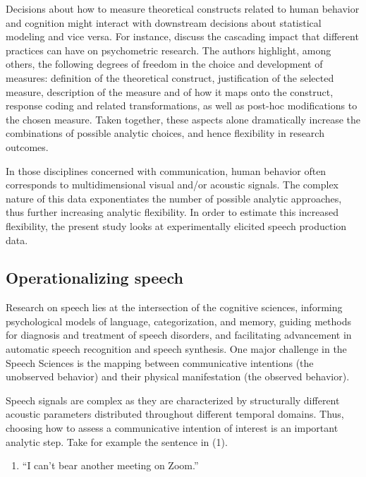 \documentclass[Review,times,sageh]{sagej}
\providecommand{\tightlist}{\setlength{\itemsep}{0pt}\setlength{\parskip}{0pt}}
\begin{document}
Decisions about how to measure theoretical constructs related to human behavior and cognition might interact with downstream decisions about statistical modeling and vice versa.
For instance, \citet{flake2020} discuss the cascading impact that different practices can have on psychometric research.
The authors highlight, among others, the following degrees of freedom in the choice and development of measures: definition of the theoretical construct, justification of the selected measure, description of the measure and of how it maps onto the construct, response coding and related transformations, as well as post-hoc modifications to the chosen measure.
Taken together, these aspects alone dramatically increase the combinations of possible analytic choices, and hence flexibility in research outcomes.

In those disciplines concerned with communication, human behavior often corresponds to multidimensional visual and/or acoustic signals.
The complex nature of this data exponentiates the number of possible analytic approaches, thus further increasing analytic flexibility.
In order to estimate this increased flexibility, the present study looks at experimentally elicited speech production data.\\

\hypertarget{s:operspeech}{%
\subsection{Operationalizing speech}\label{s:operspeech}}

Research on speech lies at the intersection of the cognitive sciences, informing psychological models of language, categorization, and memory, guiding methods for diagnosis and treatment of speech disorders, and facilitating advancement in automatic speech recognition and speech synthesis.
One major challenge in the Speech Sciences is the mapping between communicative intentions (the unobserved behavior) and their physical manifestation (the observed behavior).

Speech signals are complex as they are characterized by structurally different acoustic parameters distributed throughout different temporal domains.
Thus, choosing how to assess a communicative intention of interest is an important analytic step.
Take for example the sentence in (1).

\vspace{1em}

\begin{enumerate}
\def\labelenumi{(\arabic{enumi})}
\tightlist
\item
  ``I can't bear another meeting on Zoom.''
  \vspace{1em}
\end{enumerate}
\end{document}

